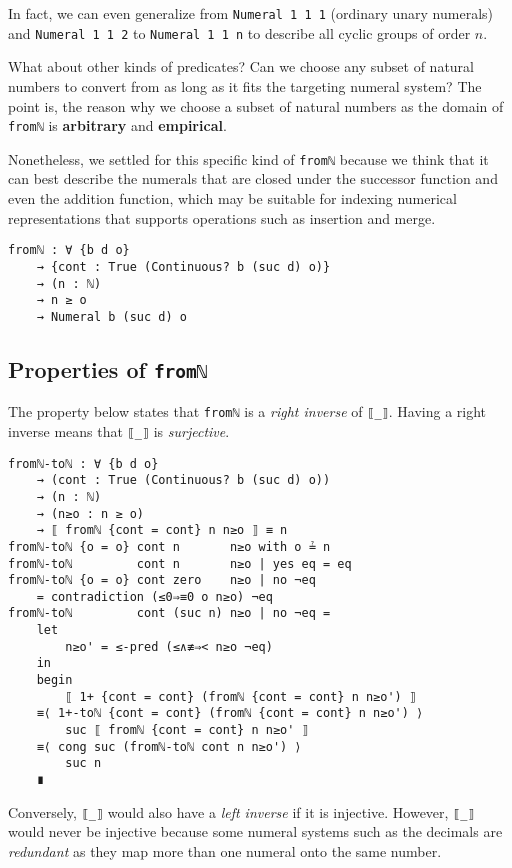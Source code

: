 \documentclass[\main/thesis.tex]{subfiles}
\begin{document}
In fact, we can even generalize from \lstinline|Numeral 1 1 1|
(ordinary unary numerals) and \lstinline|Numeral 1 1 2| to \lstinline|Numeral 1 1 n|
to describe all cyclic groups of order $ n $.

What about other kinds of predicates? Can we choose any subset of natural numbers
to convert from as long as it fits the targeting numeral system?
The point is, the reason why we choose a subset of natural numbers as the domain
of \lstinline|fromℕ| is \textbf{arbitrary} and \textbf{empirical}.

Nonetheless, we settled for this specific kind of \lstinline|fromℕ| because we
think that it can best describe the numerals that are closed under the successor
function and even the addition function, which may be suitable for indexing
numerical representations that supports operations such as insertion and merge.

\begin{lstlisting}
fromℕ : ∀ {b d o}
    → {cont : True (Continuous? b (suc d) o)}
    → (n : ℕ)
    → n ≥ o
    → Numeral b (suc d) o
\end{lstlisting}

\subsection{Properties of \lstinline|fromℕ|}

The property below states that \lstinline|fromℕ| is a \textit{right inverse} of
\lstinline|⟦_⟧|. Having a right inverse means that \lstinline|⟦_⟧| is
\textit{surjective}.

\begin{lstlisting}
fromℕ-toℕ : ∀ {b d o}
    → (cont : True (Continuous? b (suc d) o))
    → (n : ℕ)
    → (n≥o : n ≥ o)
    → ⟦ fromℕ {cont = cont} n n≥o ⟧ ≡ n
fromℕ-toℕ {o = o} cont n       n≥o with o ≟ n
fromℕ-toℕ         cont n       n≥o | yes eq = eq
fromℕ-toℕ {o = o} cont zero    n≥o | no ¬eq
    = contradiction (≤0⇒≡0 o n≥o) ¬eq
fromℕ-toℕ         cont (suc n) n≥o | no ¬eq =
    let
        n≥o' = ≤-pred (≤∧≢⇒< n≥o ¬eq)
    in
    begin
        ⟦ 1+ {cont = cont} (fromℕ {cont = cont} n n≥o') ⟧
    ≡⟨ 1+-toℕ {cont = cont} (fromℕ {cont = cont} n n≥o') ⟩
        suc ⟦ fromℕ {cont = cont} n n≥o' ⟧
    ≡⟨ cong suc (fromℕ-toℕ cont n n≥o') ⟩
        suc n
    ∎
\end{lstlisting}

Conversely, \lstinline|⟦_⟧| would also have a \textit{left inverse} if it is
injective.
However, \lstinline|⟦_⟧| would never be injective because some numeral systems
such as the decimals are \textit{redundant} as they map more than one numeral
onto the same number.
\end{document}
